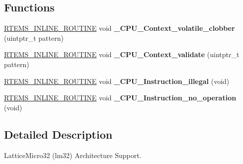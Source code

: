 \subsection*{Functions}
\begin{DoxyCompactItemize}
\item 
\mbox{\label{group__RTEMSScoreCPUlm32_gaeb1ddd8f84f82b13fad2a05a3e7d0ab7}} 
\mbox{\hyperlink{group__RTEMSScoreBaseDefs_gac216239df231d5dbd15e3520b0b9313f}{R\+T\+E\+M\+S\+\_\+\+I\+N\+L\+I\+N\+E\+\_\+\+R\+O\+U\+T\+I\+NE}} void {\bfseries \+\_\+\+C\+P\+U\+\_\+\+Context\+\_\+volatile\+\_\+clobber} (uintptr\+\_\+t pattern)
\item 
\mbox{\label{group__RTEMSScoreCPUlm32_gaae027d9a906bb67d38ebd7a9104b976b}} 
\mbox{\hyperlink{group__RTEMSScoreBaseDefs_gac216239df231d5dbd15e3520b0b9313f}{R\+T\+E\+M\+S\+\_\+\+I\+N\+L\+I\+N\+E\+\_\+\+R\+O\+U\+T\+I\+NE}} void {\bfseries \+\_\+\+C\+P\+U\+\_\+\+Context\+\_\+validate} (uintptr\+\_\+t pattern)
\item 
\mbox{\label{group__RTEMSScoreCPUlm32_ga07618c93359f2485af2e98a96b330208}} 
\mbox{\hyperlink{group__RTEMSScoreBaseDefs_gac216239df231d5dbd15e3520b0b9313f}{R\+T\+E\+M\+S\+\_\+\+I\+N\+L\+I\+N\+E\+\_\+\+R\+O\+U\+T\+I\+NE}} void {\bfseries \+\_\+\+C\+P\+U\+\_\+\+Instruction\+\_\+illegal} (void)
\item 
\mbox{\label{group__RTEMSScoreCPUlm32_gab683a0a37a089e2a0fd3c356836d5499}} 
\mbox{\hyperlink{group__RTEMSScoreBaseDefs_gac216239df231d5dbd15e3520b0b9313f}{R\+T\+E\+M\+S\+\_\+\+I\+N\+L\+I\+N\+E\+\_\+\+R\+O\+U\+T\+I\+NE}} void {\bfseries \+\_\+\+C\+P\+U\+\_\+\+Instruction\+\_\+no\+\_\+operation} (void)
\end{DoxyCompactItemize}


\subsection{Detailed Description}
Lattice\+Micro32 (lm32) Architecture Support. 

